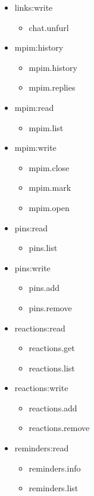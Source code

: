 \begin{multicols}{2}
\begin{itemize}
	\item links:write
	\begin{itemize}
		\item chat.unfurl
	\end{itemize}
	
	\item mpim:history
	\begin{itemize}
		\item mpim.history
		\item mpim.replies
	\end{itemize}
	
	\item mpim:read
	\begin{itemize}
		\item mpim.list
	\end{itemize}
	
	\item mpim:write
	\begin{itemize}
		\item mpim.close
		\item mpim.mark
		\item mpim.open
	\end{itemize}
	
	\item pins:read
	\begin{itemize}
		\item pins.list
	\end{itemize}
	
	\item pins:write
	\begin{itemize}
		\item pins.add
		\item pins.remove
	\end{itemize}
	
	\item reactions:read
	\begin{itemize}
		\item reactions.get
		\item reactions.list
	\end{itemize}
	
	\item reactions:write
	\begin{itemize}
		\item reactions.add
		\item reactions.remove
	\end{itemize}
	
	\item reminders:read
	\begin{itemize}
		\item reminders.info
		\item reminders.list
	\end{itemize}
	

\end{itemize}
\end{multicols}
